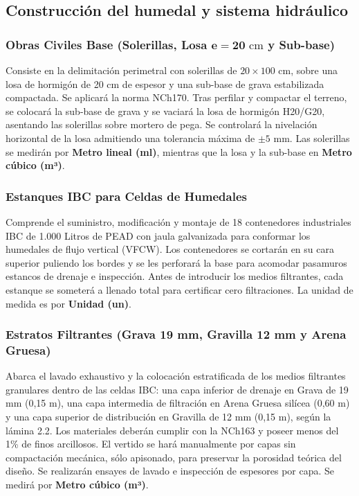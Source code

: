 \subsection{Construcción del humedal y sistema hidráulico}

\subsubsection*{\texorpdfstring{Obras Civiles Base (Solerillas, Losa \(\mathbf{e} = \mathbf{20}\text{~cm}\) y Sub-base)}{Obras Civiles Base (Solerillas, Losa \textbackslash mathbf\{e\} = \textbackslash mathbf\{20\}\textbackslash text\{\textasciitilde cm\} y Sub-base)}}

Consiste en la delimitación perimetral con solerillas de \(20 \times 100\text{~cm}\), sobre una losa de hormigón de 20 cm de espesor y una sub-base de grava estabilizada compactada. Se aplicará la norma NCh170. Tras perfilar y compactar el terreno, se colocará la sub-base de grava y se vaciará la losa de hormigón H20/G20, asentando las solerillas sobre mortero de pega. Se controlará la nivelación horizontal de la losa admitiendo una tolerancia máxima de \(\pm 5\text{~mm}\). Las solerillas se medirán por \textbf{Metro lineal (ml)}, mientras que la losa y la sub-base en \textbf{Metro cúbico (m³)}.

\subsubsection*{Estanques IBC para Celdas de Humedales}

Comprende el suministro, modificación y montaje de 18 contenedores industriales IBC de 1.000 Litros de PEAD con jaula galvanizada para conformar los humedales de flujo vertical (VFCW). Los contenedores se cortarán en su cara superior puliendo los bordes y se les perforará la base para acomodar pasamuros estancos de drenaje e inspección. Antes de introducir los medios filtrantes, cada estanque se someterá a llenado total para certificar cero filtraciones. La unidad de medida es por \textbf{Unidad (un)}.

\subsubsection*{Estratos Filtrantes (Grava 19 mm, Gravilla 12 mm y Arena Gruesa)}

Abarca el lavado exhaustivo y la colocación estratificada de los medios filtrantes granulares dentro de las celdas IBC: una capa inferior de drenaje en Grava de 19 mm (0,15 m), una capa intermedia de filtración en Arena Gruesa silícea (0,60 m) y una capa superior de distribución en Gravilla de 12 mm (0,15 m), según la lámina 2.2. Los materiales deberán cumplir con la NCh163 y poseer menos del 1\% de finos arcillosos. El vertido se hará manualmente por capas sin compactación mecánica, sólo apisonado, para preservar la porosidad teórica del diseño. Se realizarán ensayes de lavado e inspección de espesores por capa. Se medirá por \textbf{Metro cúbico (m³)}.

